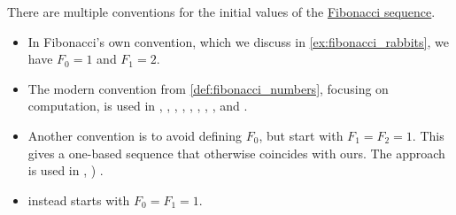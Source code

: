\begin{remark}\label{rem:fibonacci_sequence_initial_value}
  There are multiple conventions for the initial values of the \hyperref[def:fibonacci_numbers]{Fibonacci sequence}.

  \begin{itemize}
    \item In Fibonacci's own convention, which we discuss in \cref{ex:fibonacci_rabbits}, we have \( F_0 = 1 \) and \( F_1 = 2 \).

    \item The modern convention from \cref{def:fibonacci_numbers}, focusing on computation, is used in
    \cite[98]{Aigner1997CombinatorialTheory},
    \cite[467]{LidlNiederreiter1997FiniteFields},
    \cite[def. 2.4.5]{Rosen2019DiscreteMathematics},
    \cite[112]{ConwayGuy1998BookOfNumbers},
    \cite[122]{Mimram2020ProgramEqualsProof},
    \cite[98]{Erickson2019Algorithms},
    \cite[13]{Knuth1997ArtVol1},
    \cite[exerc. B-5.14(ii)]{Rotman2015AdvancedModernAlgebraPart1},
    \cite[59]{Мальцев1986Алгоритмы} and
    \cite[\S 5.7.3]{Новиков2013ДискретнаяМатематика}.

    \item Another convention is to avoid defining \( F_0 \), but start with \( F_1 = F_2 = 1 \). This gives a one-based sequence that otherwise coincides with ours. The approach is used in
    \cite[273]{Deza2012FigurateNumbers},
    \cite[example 1.1.12]{Stanley2012EnumerativeCombinatoricsVol1}
    \cite[exerc. 7.15]{ГашковЧубариков2005СложностьВычисления})
    \cite[97]{Зорич2019АнализЧасть1}.

    \item \Textcite[198]{Яблонский2003ДискретнаяМатематика} instead starts with \( F_0 = F_1 = 1 \).
  \end{itemize}
\end{remark}

